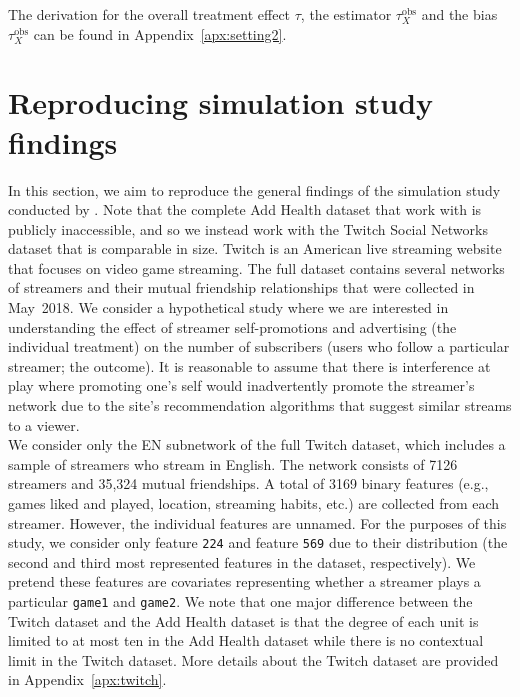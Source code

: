 \documentclass[10pt]{article}
\begin{document}
The derivation for the overall treatment effect $\tau$, the estimator $\tau_{X}^\text{obs}$ and the bias $\tau_{X}^\text{obs}$ can be found in Appendix~\ref{apx:setting2}.



\section{Reproducing simulation study findings} \label{sec:simulation}

In this section, we aim to reproduce the general findings of the simulation study conducted by \textcite{Forastiere:2021}. Note that the complete Add Health dataset that \citeauthor{Forastiere:2021} work with is publicly inaccessible, and so we instead work with the Twitch Social Networks dataset \parencite{Rozemberczki:2021} that is comparable in size. Twitch is an American live streaming website that focuses on video game streaming. The full dataset contains several networks of streamers and their mutual friendship relationships that were collected in May~2018. We consider a hypothetical study where we are interested in understanding the effect of streamer self-promotions and advertising (the individual treatment) on the number of subscribers (users who follow a particular streamer; the outcome). It is reasonable to assume that there is interference at play where promoting one's self would inadvertently promote the streamer's network due to the site's recommendation algorithms that suggest similar streams to a viewer.
\\

We consider only the EN subnetwork of the full Twitch dataset, which includes a sample of streamers who stream in English. The network consists of 7126 streamers and 35,324 mutual friendships. A total of 3169 binary features (e.g., games liked and played, location, streaming habits, etc.) are collected from each streamer. However, the individual features are unnamed. For the purposes of this study, we consider only feature \verb|224| and feature \verb|569| due to their distribution (the second and third most represented features in the dataset, respectively). We pretend these features are covariates representing whether a streamer plays a particular \verb|game1| and \verb|game2|. We note that one major difference between the Twitch dataset and the Add Health dataset is that the degree of each unit is limited to at most ten in the Add Health dataset while there is no contextual limit in the Twitch dataset. More details about the Twitch dataset are provided in Appendix~\ref{apx:twitch}.
\\
\end{document}

